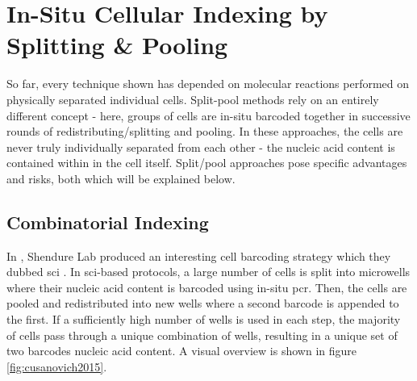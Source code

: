 \newpage
\section{In-Situ Cellular Indexing by Splitting \& Pooling}
\label{sec:lit_splitting_pooling}
So far, every technique shown has depended on molecular reactions performed on physically separated individual cells. Split-pool methods rely on an entirely different concept - here, groups of cells are in-situ barcoded together in successive rounds of redistributing/splitting and pooling. In these approaches, the cells are never truly individually separated from each other - the nucleic acid content is contained within in the cell itself. Split/pool approaches pose specific advantages and risks, both which will be explained below.\pms

\subsection{Combinatorial Indexing}
\label{subsect:lit_combinatorial_indexing}
In \citeyear{cusanovich2015}, Shendure Lab produced an interesting cell barcoding strategy which they dubbed \acrfull{sci} \citep{cusanovich2015}. In \acrshort{sci}-based protocols, a large number of cells is split into microwells where their nucleic acid content is barcoded using in-situ \acrshort{pcr}. Then, the cells are pooled and redistributed into new wells where a second barcode is appended to the first. If a sufficiently high number of wells is used in each step, the majority of cells pass through a unique combination of wells, resulting in a unique set of two barcodes nucleic acid content. A visual overview is shown in figure \ref{fig:cusanovich2015}.\pms

